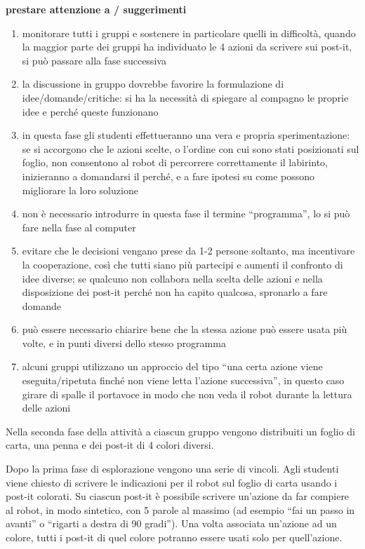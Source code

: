 \documentclass[12pt]{article}
\begin{document}
\textbf{prestare attenzione a / suggerimenti}
\begin{enumerate}
\item monitorare tutti i gruppi e sostenere in particolare quelli in difficoltà, quando la maggior parte dei gruppi ha individuato le 4 azioni da scrivere sui post-it, si può passare alla fase successiva
\item la discussione in gruppo dovrebbe favorire la formulazione di idee/domande/critiche: si ha la necessità di spiegare al compagno le proprie idee e perché queste funzionano
\item in questa fase gli studenti effettueranno una vera e propria sperimentazione: se si accorgono che le azioni scelte, o l’ordine con cui sono stati posizionati sul foglio, non consentono al robot di percorrere correttamente il labirinto, inizieranno a domandarsi il perché, e a fare ipotesi su come possono migliorare la loro soluzione
\item non è necessario introdurre in questa fase il termine “programma”, lo si può fare nella fase al computer
\item evitare che le decisioni vengano prese da 1-2 persone soltanto, ma incentivare la cooperazione, così che tutti siano più partecipi e aumenti il confronto di idee diverse; se qualcuno non collabora nella scelta delle azioni e nella disposizione dei post-it perché non ha capito qualcosa, spronarlo a fare domande
\item può essere necessario chiarire bene che la stessa azione può essere usata più volte, e in punti diversi dello stesso programma
\item alcuni gruppi utilizzano un approccio del tipo ``una certa azione viene eseguita/ripetuta finché non viene letta l’azione successiva”, in questo caso girare di spalle il portavoce in modo che non veda il robot durante la lettura delle azioni
\end{enumerate}

Nella seconda fase della attività a ciascun gruppo vengono distribuiti un foglio di carta, una penna e dei post-it di 4 colori diversi.

Dopo la prima fase di esplorazione vengono una serie di vincoli. Agli studenti viene chiesto di scrivere le indicazioni per il robot sul foglio di carta usando i post-it colorati. Su ciascun post-it è possibile scrivere un’azione da far compiere al robot, in modo sintetico, con 5 parole al massimo (ad esempio ``fai un passo in avanti” o ``rigarti a destra di 90 gradi”). Una volta associata un’azione ad un colore, tutti  i post-it di quel colore potranno essere usati solo
per quell’azione.
\end{document}
